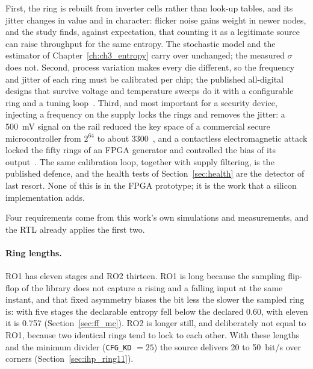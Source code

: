 First, the ring is rebuilt from inverter cells rather than look-up tables,
and its jitter changes in value and in character: flicker noise gains
weight in newer nodes, and the study finds, against expectation, that
counting it as a legitimate source can raise throughput for the same
entropy. The stochastic model and the estimator of
Chapter~\ref{ch:ch3_entropy} carry over unchanged; the measured $\sigma$
does not. Second, process variation makes every die different, so the
frequency and jitter of each ring must be calibrated per chip; the
published all-digital designs that survive voltage and temperature
sweeps do it with a configurable ring and a tuning loop~\cite{yang_2016_jssc}.
Third, and most important for a security device, injecting a frequency on
the supply locks the rings and removes the jitter: a 500~mV signal on
the rail reduced the key space of a commercial secure microcontroller
from $2^{64}$ to about 3300~\cite{markettos_2009_frequency}, and a
contactless electromagnetic attack locked the fifty rings of an
\ac{FPGA} generator and controlled the bias of its
output~\cite{bayon_2012_contactless}. The same calibration
loop, together with supply filtering, is the published defence, and the
health tests of Section~\ref{sec:health} are the detector of last resort.
None of this is in the FPGA prototype; it is the work that a silicon
implementation adds.

Four requirements come from this work's own simulations and
measurements, and the \ac{RTL} already applies the first two.

\paragraph{Ring lengths.} RO1 has eleven stages and RO2 thirteen. RO1 is
long because the sampling flip-flop of the library does not capture a
rising and a falling input at the same instant, and that fixed asymmetry
biases the bit less the slower the sampled ring is: with five stages the
declarable entropy fell below the declared 0.60, with eleven it is 0.757
\simu{} (Section~\ref{sec:ff_mc}). RO2 is longer still, and deliberately
not equal to RO1, because two identical rings tend to lock to each
other. With these lengths and the minimum divider 
(\texttt{CFG\_KD} $= 25$) the source delivers 20 to 50~bit/s over
corners \est{} (Section~\ref{sec:ihp_ring11}).

